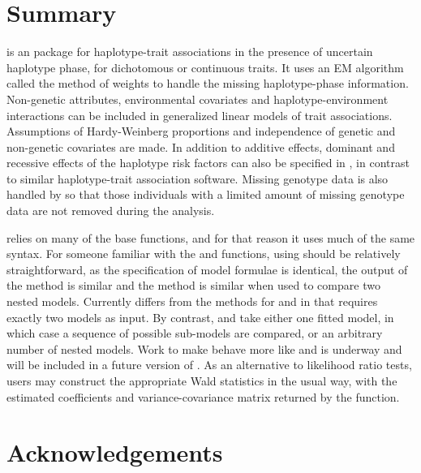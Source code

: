 \documentclass[article, shortnames]{jss}
\begin{document}
\section{Summary}

 is an  package for haplotype-trait associations
in the presence of uncertain haplotype phase, for dichotomous or
continuous traits. It uses an EM algorithm called the method of weights to
handle the missing haplotype-phase information. Non-genetic attributes, 
environmental covariates and haplotype-environment interactions can be 
included in generalized linear models of trait associations. Assumptions 
of Hardy-Weinberg proportions and independence of genetic and non-genetic 
covariates are made.  In addition to additive effects, dominant and recessive 
effects of the haplotype risk factors can also be specified in , 
in contrast to similar haplotype-trait association software. 
Missing genotype data
is also handled by  so that those 
individuals with a limited amount 
of missing genotype data are not removed during the analysis. 

 relies on many of the  base functions, and for that
reason it uses much of the same syntax. For someone familiar with the
  and  functions, using 
should be relatively straightforward, as the specification of 
model formulae is 
identical, the output of the  method is 
similar and the  method is similar
when used to compare two nested models. 
Currently  differs from the  methods
for  and  in that  requires
exactly two models as input. By contrast,  and 
 take either one fitted model, in which case a 
sequence of possible sub-models are compared, or 
an arbitrary number of nested models.
Work to make  behave more like 
and  is underway and will
be included in a future version of . 
As an alternative to likelihood ratio tests, users may construct the
appropriate Wald statistics in the usual way, with the 
estimated coefficients and variance-covariance matrix returned by the 
 function.


\section*{Acknowledgements}
\end{document}
